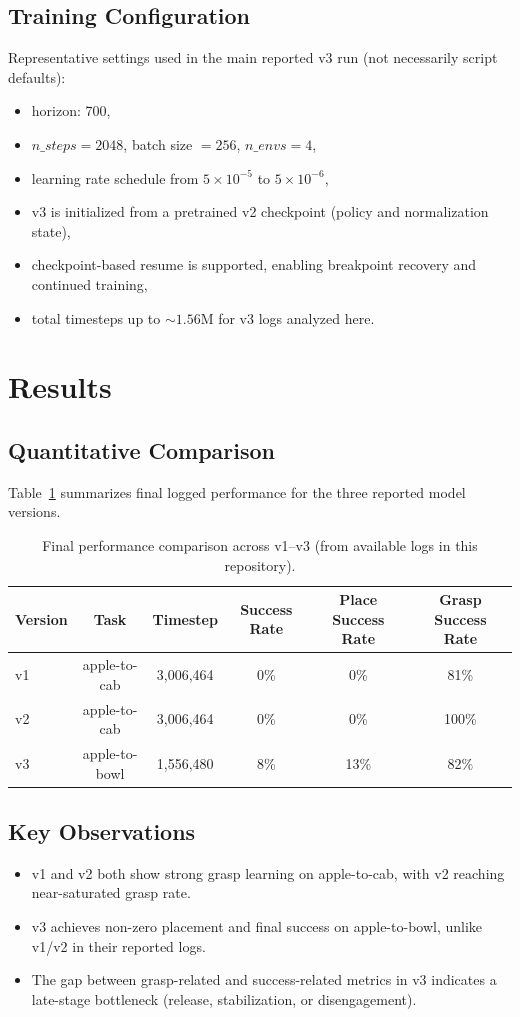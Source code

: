 \documentclass[11pt,a4paper]{article}
\begin{document}
\subsection{Training Configuration}
Representative settings used in the main reported v3 run (not necessarily script defaults):
\begin{itemize}
    \item horizon: 700,
    \item \(n\_steps=2048\), batch size \(=256\), \(n\_envs=4\),
    \item learning rate schedule from \(5\times10^{-5}\) to \(5\times10^{-6}\),
    \item v3 is initialized from a pretrained v2 checkpoint (policy and normalization state),
    \item checkpoint-based resume is supported, enabling breakpoint recovery and continued training,
    \item total timesteps up to \(\sim 1.56\)M for v3 logs analyzed here.
\end{itemize}

\section{Results}
\subsection{Quantitative Comparison}
Table~\ref{tab:main} summarizes final logged performance for the three reported model versions.

\begin{table}[h]
\centering
\caption{Final performance comparison across v1--v3 (from available logs in this repository).}
\label{tab:main}
\begin{tabular}{@{}lccccc@{}}
\toprule
Version & Task & Timestep & Success Rate & Place Success Rate & Grasp Success Rate \\
\midrule
v1 & apple-to-cab & 3,006,464 & 0\% & 0\% & 81\% \\
v2 & apple-to-cab & 3,006,464 & 0\% & 0\% & 100\% \\
v3 & apple-to-bowl & 1,556,480 & 8\% & 13\% & 82\% \\
\bottomrule
\end{tabular}
\end{table}

\subsection{Key Observations}
\begin{itemize}
    \item v1 and v2 both show strong grasp learning on apple-to-cab, with v2 reaching near-saturated grasp rate.
    \item v3 achieves non-zero placement and final success on apple-to-bowl, unlike v1/v2 in their reported logs.
    \item The gap between grasp-related and success-related metrics in v3 indicates a late-stage bottleneck (release, stabilization, or disengagement).
\end{itemize}
\end{document}
